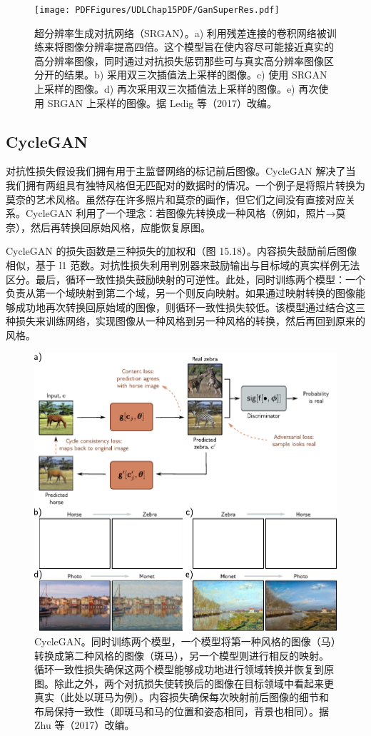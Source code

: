 \documentclass[lang=cn,newtx,10pt,scheme=chinese]{elegantbook}
\begin{document}
\begin{figure}[ht!]
\centering
\texttt{[image: PDFFigures/UDLChap15PDF/GanSuperRes.pdf]}
\caption{超分辨率生成对抗网络（SRGAN）。a) 利用残差连接的卷积网络被训练来将图像分辨率提高四倍。这个模型旨在使内容尽可能接近真实的高分辨率图像，同时通过对抗损失惩罚那些可与真实高分辨率图像区分开的结果。b) 采用双三次插值法上采样的图像。c) 使用 SRGAN 上采样的图像。d) 再次采用双三次插值法上采样的图像。e) 再次使用 SRGAN 上采样的图像。据 Ledig 等（2017）改编。}
\end{figure}


\subsection{CycleGAN}
对抗性损失假设我们拥有用于主监督网络的标记前后图像。CycleGAN 解决了当我们拥有两组具有独特风格但无匹配对的数据时的情况。一个例子是将照片转换为莫奈的艺术风格。虽然存在许多照片和莫奈的画作，但它们之间没有直接对应关系。CycleGAN 利用了一个理念：若图像先转换成一种风格（例如，照片→莫奈），然后再转换回原始风格，应能恢复原图。

CycleGAN 的损失函数是三种损失的加权和（图 15.18）。内容损失鼓励前后图像相似，基于 l1 范数。对抗性损失利用判别器来鼓励输出与目标域的真实样例无法区分。最后，循环一致性损失鼓励映射的可逆性。此处，同时训练两个模型：一个负责从第一个域映射到第二个域，另一个则反向映射。如果通过映射转换的图像能够成功地再次转换回原始域的图像，则循环一致性损失较低。该模型通过结合这三种损失来训练网络，实现图像从一种风格到另一种风格的转换，然后再回到原来的风格。

\begin{figure}[ht!]
\centering
\includegraphics[width=0.7\linewidth]{PDFFigures/UDLChap15PDF/GANCycleGAN.pdf}
\caption{CycleGAN。同时训练两个模型，一个模型将第一种风格的图像（马）转换成第二种风格的图像（斑马），另一个模型则进行相反的映射。循环一致性损失确保这两个模型能够成功地进行领域转换并恢复到原图。除此之外，两个对抗损失使转换后的图像在目标领域中看起来更真实（此处以斑马为例）。内容损失确保每次映射前后图像的细节和布局保持一致性（即斑马和马的位置和姿态相同，背景也相同）。据 Zhu 等（2017）改编。}
\end{figure}
\end{document}

